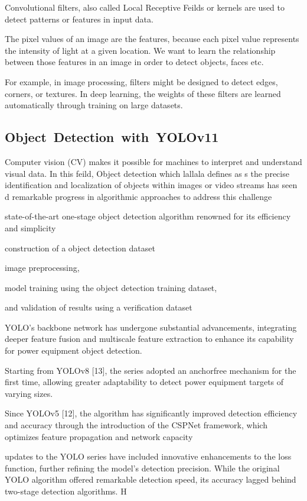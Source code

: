 \documentclass[a4paper,10pt,twocolumn]{article}
\numberwithin{figure}{section}
\numberwithin{table}{section}
\begin{document}
Convolutional filters, also called Local Receptive Feilds or kernels are used
to detect patterns or features in input data. 

The pixel values of an image are the features, because each pixel value represents the intensity of light at a given location. We want to learn the relationship between those features in an image in order to detect objects, faces etc. 

For example, in image processing, filters might be designed to detect edges, 
corners, or textures. In deep learning, the weights of these filters are learned automatically through training on large datasets.






\subsection{\mbox{Object Detection with YOLOv11}}
Computer vision (CV) makes it possible for machines to interpret and understand 
visual data. In this feild, Object detection which lallala defines as
s the precise identification and localization of objects within
images or video streams has seen d remarkable progress in algorithmic approaches to address this
challenge 

state-of-the-art one-stage object detection algorithm 
renowned for its efficiency and simplicity

construction of a object detection dataset

image preprocessing, 

model training using the object detection training dataset,

and validation of results using a verification dataset

YOLO’s backbone network has undergone
substantial advancements, integrating deeper feature fusion
and multiscale feature extraction to enhance its capability for
power equipment object detection. 

Starting from YOLOv8 [13], the series adopted an 
anchorfree mechanism for the first time, allowing 
greater adaptability to detect power equipment 
targets of varying sizes.

Since YOLOv5 [12], the
algorithm has significantly improved detection efficiency and
accuracy through the introduction of the CSPNet framework,
which optimizes feature propagation and network capacity

updates to the YOLO series have included
innovative enhancements to the loss function, further refining
the model’s detection precision. While the original YOLO
algorithm offered remarkable detection speed, its accuracy
lagged behind two-stage detection algorithms. H
\end{document}
